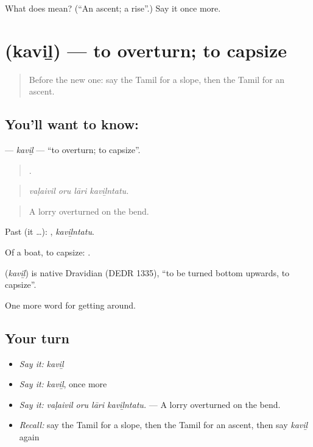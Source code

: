 \begin{tcolorbox}[breakable,colback=teal!4,colframe=teal!35!black,title={Before you move on}]
What does  mean? (\textquotedblleft{}An ascent; a rise\textquotedblright{}.) Say it once more.
\end{tcolorbox}
\section[\texorpdfstring{\ta{கவிழ்} (kaviḻ)}{கவிழ் (kaviḻ)}]{ (kaviḻ) — to overturn; to capsize}

\label{lesson:TA-C408-kavil}



\begin{quote}
Before the new one: say the Tamil for a slope, then the Tamil for an ascent.
\end{quote}

\subsection*{You'll want to know: }
\textbf{} — \emph{kaviḻ} — \textquotedblleft{}to overturn; to capsize\textquotedblright{}.

\begin{quote}
   .
\end{quote}

\begin{quote}
\emph{vaḷaivil oru lāri kaviḻntatu.}
\end{quote}

\begin{quote}
A lorry overturned on the bend.
\end{quote}

Past (it …): , \emph{kaviḻntatu}.

Of a boat, to capsize:  .

\begin{cousinweb}
\textbf{} (\emph{kaviḻ}) is native Dravidian (DEDR 1335), \textquotedblleft{}to be turned bottom upwards, to capsize\textquotedblright{}.
\end{cousinweb}

\begin{grammarlens}[title={What you've built}]
One more word for getting around.
\end{grammarlens}

\subsection*{Your turn}
\begin{itemize}
\raggedright
  \item \emph{Say it:} \emph{kaviḻ}
  \item \emph{Say it:} \emph{kaviḻ}, once more
  \item \emph{Say it:} \emph{vaḷaivil oru lāri kaviḻntatu.} — A lorry overturned on the bend.
  \item \emph{Recall:} say the Tamil for a slope, then the Tamil for an ascent, then say \emph{kaviḻ} again
\end{itemize}

